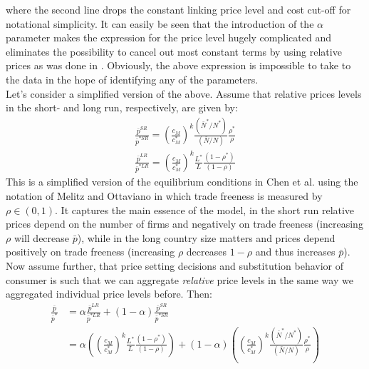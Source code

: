 where the second line drops the constant linking price level and cost cut-off for notational simplicity. It can easily be seen that the introduction of the $\alpha$ parameter makes the expression for the price level hugely complicated and eliminates the possibility to cancel out most constant terms by using relative prices as was done in \citet{Chen2009}. Obviously, the above expression is impossible to take to the data in the hope of identifying any of the parameters. \\
Let's consider a simplified version of the above. Assume that relative prices levels in the short- and long run, respectively, are given by:
\begin{align*}
\frac{\bar{p}^{SR}}{\bar{p}^{*SR}} = \left( \frac{c_M}{c_M^*} \right)^k \frac{(\bar{N}^* / N^*)}{(\bar{N} / N)} \frac{\rho^*}{\rho} \\
\frac{\bar{p}^{LR}}{\bar{p}^{*LR}} = \left( \frac{c_M}{c_M^*} \right)^k \frac{L^*}{L} \frac{(1-\rho^*)}{(1-\rho)}
\end{align*}
This is a simplified version of the equilibrium conditions in Chen et al. using the notation of Melitz and Ottaviano in which trade freeness is measured by $\rho \in (0,1)$. It captures the main essence of the model, in the short run relative prices depend on the number of firms and negatively on trade freeness (increasing $\rho$ will decrease $\bar{p}$), while in the long country size matters and prices depend positively on trade freeness (increasing $\rho$ decreases $1-\rho$ and thus increases $\bar{p}$). Now assume further, that price setting decisions and substitution behavior of consumer is such that we can aggregate \textit{relative} price levels in the same way we aggregated individual price levels before. Then:
\begin{align*}
\frac{\bar{p}}{\bar{p}^*} &= \alpha \frac{\bar{p}^{LR}}{\bar{p}^{*LR}} + (1-\alpha) \frac{\bar{p}^{SR}}{\bar{p}^{*SR}} \\
													&= \alpha \left( \left( \frac{c_M}{c_M^*} \right)^k \frac{L^*}{L} \frac{(1-\rho^*)}{(1-\rho)} \right) + (1-\alpha) \left( \left( \frac{c_M}{c_M^*} \right)^k \frac{(\bar{N}^* / N^*)}{(\bar{N} / N)} \frac{\rho^*}{\rho} \right)
\end{align*}
